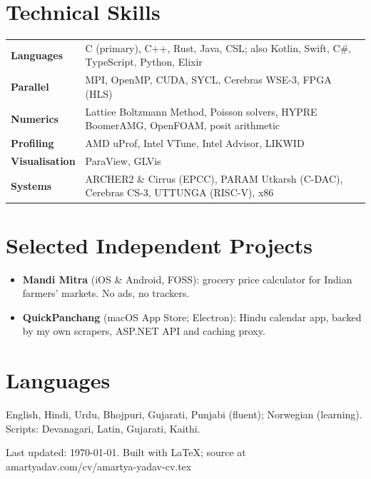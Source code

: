 \documentclass[10pt,a4paper]{article}
\begin{document}
\section*{Technical Skills}
\begin{tabularx}{\linewidth}{@{}l X@{}}
  \textbf{Languages}   & C (primary), C++, Rust, Java, CSL; also Kotlin, Swift, C\#, TypeScript, Python, Elixir \\
  \textbf{Parallel}    & MPI, OpenMP, CUDA, SYCL, Cerebras WSE-3, FPGA (HLS) \\
  \textbf{Numerics}    & Lattice Boltzmann Method, Poisson solvers, HYPRE BoomerAMG, OpenFOAM, posit arithmetic \\
  \textbf{Profiling}   & AMD uProf, Intel VTune, Intel Advisor, LIKWID \\
  \textbf{Visualisation} & ParaView, GLVis \\
  \textbf{Systems}     & ARCHER2 \& Cirrus (EPCC), PARAM Utkarsh (C-DAC), Cerebras CS-3, UTTUNGA (RISC-V), x86
\end{tabularx}

\section*{Selected Independent Projects}
\begin{itemize}
  \item \textbf{Mandi Mitra} (iOS \& Android, FOSS): grocery price calculator for Indian farmers' markets.
        No ads, no trackers.
  \item \textbf{QuickPanchang} (macOS App Store; Electron): Hindu calendar app, backed by my own scrapers,
        ASP.NET API and caching proxy.
\end{itemize}

\section*{Languages}
English, Hindi, Urdu, Bhojpuri, Gujarati, Punjabi (fluent); Norwegian (learning).
Scripts: Devanagari, Latin, Gujarati, Kaithi.

\vfill
{\footnotesize\color{gray} Last updated: \today. Built with \LaTeX; source at amartyadav.com/cv/amartya-yadav-cv.tex}
\end{document}
